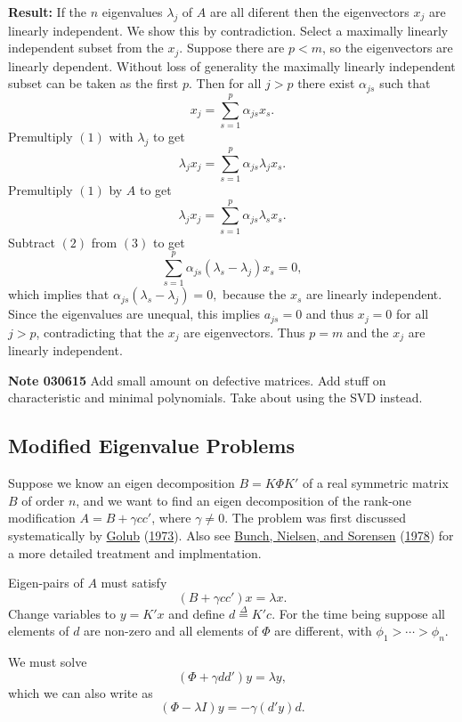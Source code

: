 \documentclass[
  12pt,
]{book}
\begin{document}
\textbf{Result:} If the \(n\) eigenvalues \(\lambda_j\) of \(A\) are all diferent then the eigenvectors \(x_j\) are linearly independent. We show this by contradiction. Select a maximally linearly independent subset from the \(x_j\). Suppose there are \(p<m\), so the eigenvectors are linearly dependent. Without loss of generality the maximally linearly independent subset can be
taken as the first \(p\). Then for all \(j>p\) there exist \(\alpha_{js}\) such that
\[
x_j=\sum_{s=1}^p\alpha_{js} x_s.\tag{1}
\]
Premultiply \((1)\) with \(\lambda_j\) to get
\[
\lambda_jx_j=\sum_{s=1}^p\alpha_{js} \lambda_jx_s.\tag{2}
\]
Premultiply \((1)\) by \(A\) to get
\[
\lambda_jx_j=\sum_{s=1}^p\alpha_{js} \lambda_sx_s.\tag{3}
\]
Subtract \((2)\) from \((3)\) to get
\[
\sum_{s=1}^p\alpha_{js}(\lambda_s-\lambda_j)x_s = 0,
\]
which implies that \(\alpha_{js}(\lambda_s-\lambda_j)=0,\)
because the \(x_s\) are linearly independent. Since the
eigenvalues are unequal, this implies \(a_{js}=0\) and thus \(x_j=0\) for all \(j>p\), contradicting that the \(x_j\)
are eigenvectors. Thus \(p=m\) and the \(x_j\) are linearly independent.

\textbf{Note 030615} Add small amount on defective matrices. Add stuff
on characteristic and minimal polynomials. Take about using the
SVD instead.

\hypertarget{modified-eigenvalue-problems}{%
\subsection{Modified Eigenvalue Problems}\label{modified-eigenvalue-problems}}

Suppose we know an eigen decomposition \(B=K\Phi K'\) of a real symmetric matrix \(B\) of order \(n\), and we want to find an eigen decomposition of the rank-one modification \(A=B+\gamma cc'\), where \(\gamma\not= 0\). The problem was first discussed systematically by
\protect\hyperlink{ref-golub_73}{Golub} (\protect\hyperlink{ref-golub_73}{1973}). Also see \protect\hyperlink{ref-bunch_nielsen_sorensen_78}{Bunch, Nielsen, and Sorensen} (\protect\hyperlink{ref-bunch_nielsen_sorensen_78}{1978})
for a more detailed treatment and implmentation.

Eigen-pairs of \(A\) must satisfy
\[
(B+\gamma cc')x=\lambda x.
\]
Change variables to \(y=K'x\) and define \(d\mathop{=}\limits^{\Delta}K'c\).
For the time being suppose all elements of \(d\) are non-zero and all elements of \(\Phi\) are different,
with \(\phi_1>\cdots>\phi_n\).

We must solve
\[
(\Phi+\gamma dd')y=\lambda y,
\]
which we can also write as
\[
(\Phi-\lambda I)y=-\gamma (d'y)d.
\]
\end{document}
